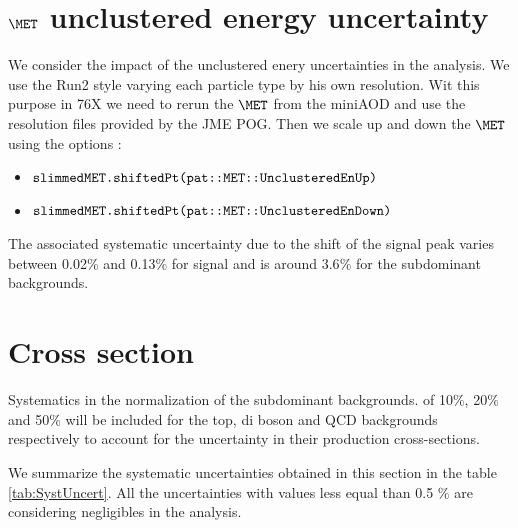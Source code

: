 \section{$\MET$ unclustered energy uncertainty}

We consider the impact of the unclustered enery uncertainties in the analysis. We use the Run2 style varying each particle type by his own resolution. Wit this purpose in 76X we need to rerun the $\MET$ from the miniAOD and use the resolution files provided by the JME POG.  
Then we scale up and down the $\MET$ using the options :
\begin{itemize}
\item
 $\verb|slimmedMET.shiftedPt(pat::MET::UnclusteredEnUp)|$ 
\item
 $\verb|slimmedMET.shiftedPt(pat::MET::UnclusteredEnDown)|$
\end{itemize}
The associated systematic uncertainty due to the shift of the signal peak varies between 0.02$\%$ and 0.13$\%$ for signal and is around 3.6$\%$ for the subdominant backgrounds. \\

\section{Cross section}
Systematics in the normalization of the subdominant backgrounds. of 10$\%$, 20$\%$ and 50$\%$ will be included for the top, di boson and QCD backgrounds respectively to account for the uncertainty in their production cross-sections. 


We summarize the systematic uncertainties obtained in this section in the table \ref{tab:SystUncert}. All the uncertainties with values less equal than  0.5 $\%$ are considering negligibles in the analysis.


